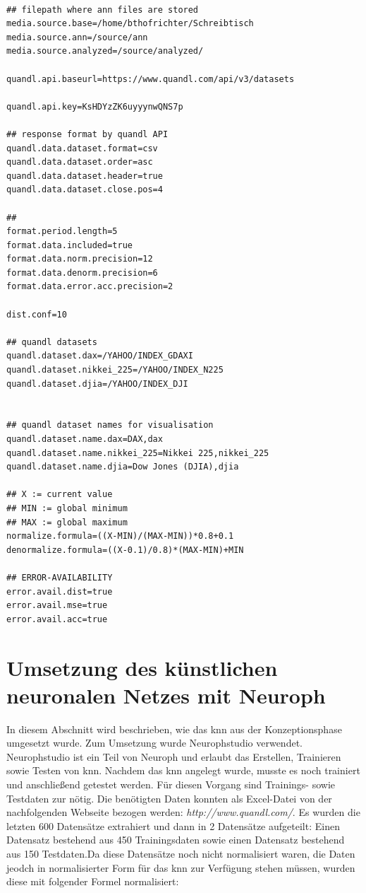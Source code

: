 \begin{lstlisting}[basicstyle=\scriptsize, caption=Snippet - app.properties]

## filepath where ann files are stored
media.source.base=/home/bthofrichter/Schreibtisch
media.source.ann=/source/ann
media.source.analyzed=/source/analyzed/

quandl.api.baseurl=https://www.quandl.com/api/v3/datasets

quandl.api.key=KsHDYzZK6uyyynwQNS7p

## response format by quandl API
quandl.data.dataset.format=csv
quandl.data.dataset.order=asc
quandl.data.dataset.header=true
quandl.data.dataset.close.pos=4

##
format.period.length=5
format.data.included=true
format.data.norm.precision=12
format.data.denorm.precision=6
format.data.error.acc.precision=2

dist.conf=10

## quandl datasets
quandl.dataset.dax=/YAHOO/INDEX_GDAXI
quandl.dataset.nikkei_225=/YAHOO/INDEX_N225
quandl.dataset.djia=/YAHOO/INDEX_DJI


## quandl dataset names for visualisation
quandl.dataset.name.dax=DAX,dax
quandl.dataset.name.nikkei_225=Nikkei 225,nikkei_225
quandl.dataset.name.djia=Dow Jones (DJIA),djia

## X := current value
## MIN := global minimum
## MAX := global maximum
normalize.formula=((X-MIN)/(MAX-MIN))*0.8+0.1
denormalize.formula=((X-0.1)/0.8)*(MAX-MIN)+MIN

## ERROR-AVAILABILITY
error.avail.dist=true
error.avail.mse=true
error.avail.acc=true
\end{lstlisting}


\section{Umsetzung des künstlichen neuronalen Netzes mit Neuroph} %
\label{section:Umsetzung des künstlichen neuronalen Netzes mit Neuroph} %

In diesem Abschnitt wird beschrieben, wie das \acs{knn} aus der Konzeptionsphase umgesetzt wurde. Zum Umsetzung wurde Neurophstudio verwendet. Neurophstudio ist ein Teil von Neuroph und erlaubt das Erstellen, Trainieren sowie Testen von \acs{knn}.
Nachdem das \acs{knn} angelegt wurde, musste es noch trainiert und anschließend getestet werden. Für diesen Vorgang sind Trainings- sowie Testdaten zur nötig. Die benötigten Daten konnten als Excel-Datei von der nachfolgenden Webseite bezogen werden: 
\textit{http://www.quandl.com/}. Es wurden die letzten 600 Datensätze extrahiert und dann in 2 Datensätze aufgeteilt: Einen Datensatz bestehend aus 450 Trainingsdaten sowie einen Datensatz bestehend aus 150 Testdaten.Da diese Datensätze noch nicht normalisiert waren, die Daten jeodch in normalisierter Form für das \acs{knn} zur Verfügung stehen müssen, wurden diese mit folgender Formel normalisiert:

